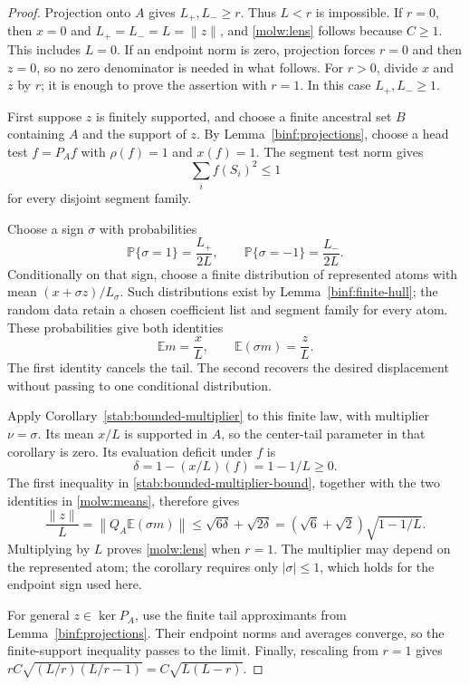 \begin{proof}
Projection onto $A$ gives $L_+,L_-\ge r$. Thus $L<r$ is impossible.
If $r=0$, then $x=0$ and $L_+=L_-=L=\|z\|$, and
\eqref{molw:lens} follows because $C\ge1$. This includes $L=0$.
If an endpoint norm is zero, projection forces $r=0$ and then $z=0$,
so no zero denominator is needed in what follows. For $r>0$, divide
$x$ and $z$ by $r$; it is enough to prove the assertion with $r=1$.
In this case $L_+,L_-\ge1$.

First suppose $z$ is finitely supported, and choose a finite ancestral
set $B$ containing $A$ and the support of $z$. By
Lemma~\ref{binf:projections}, choose a head test $f=P_Af$ with
$\rho(f)=1$ and $x(f)=1$. The segment test norm gives
\begin{equation}\label{molw:test}
 \sum_i f(S_i)^2\le1
\end{equation}
for every disjoint segment family.

Choose a sign $\sigma$ with probabilities
\begin{equation}\label{molw:weights}
 \mathbb P\{\sigma=1\}=\frac{L_+}{2L},\qquad
 \mathbb P\{\sigma=-1\}=\frac{L_-}{2L}.
\end{equation}
Conditionally on that sign, choose a finite distribution of represented
atoms with mean $(x+\sigma z)/L_\sigma$. Such distributions exist by
Lemma~\ref{binf:finite-hull}; the random data retain a chosen
coefficient list and segment family for every atom. These probabilities
give both identities
\begin{equation}\label{molw:means}
 \mathbb E m=\frac{x}{L},\qquad
 \mathbb E(\sigma m)=\frac{z}{L}.
\end{equation}
The first identity cancels the tail. The second recovers the desired
displacement without passing to one conditional distribution.

Apply Corollary~\ref{stab:bounded-multiplier} to this finite law,
with multiplier $\nu=\sigma$. Its mean $x/L$ is supported in $A$,
so the center-tail parameter in that corollary is zero. Its evaluation
deficit under $f$ is
\[
 \delta=1-(x/L)(f)=1-1/L\ge0.
\]
The first inequality in \eqref{stab:bounded-multiplier-bound}, together
with the two identities in \eqref{molw:means}, therefore gives
\[
 \frac{\|z\|}{L}
 =\left\|Q_A\mathbb E(\sigma m)\right\|
 \le\sqrt{6\delta}+\sqrt{2\delta}
 =(\sqrt6+\sqrt2)\sqrt{1-1/L}.
\]
Multiplying by $L$ proves \eqref{molw:lens} when $r=1$.
The multiplier may depend on the represented atom; the corollary requires
only $|\sigma|\le1$, which holds for the endpoint sign used here.

For general $z\in\ker P_A$, use the finite tail approximants from
Lemma~\ref{binf:projections}. Their endpoint norms and averages
converge, so the finite-support inequality passes to the limit.
Finally, rescaling from $r=1$ gives
$rC\sqrt{(L/r)(L/r-1)}=C\sqrt{L(L-r)}$.
\end{proof}


